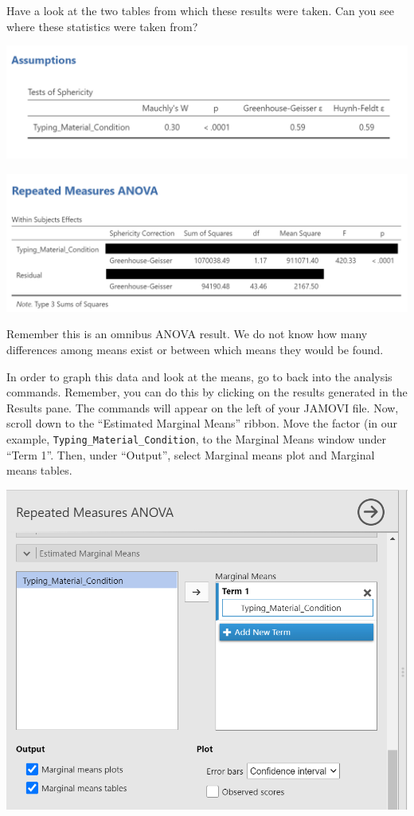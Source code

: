 \documentclass[
]{book}
\begin{document}
Have a look at the two tables from which these results were taken. Can you see where these statistics were taken from?

\includegraphics{img/RM_ANOVA_MauchlysTestResults.png}

\includegraphics{img/RM_ANOVA_Results_Simplified.png}

Remember this is an omnibus ANOVA result. We do not know how many differences among means exist or between which means they would be found.

In order to graph this data and look at the means, go to back into the analysis commands. Remember, you can do this by clicking on the results generated in the Results pane. The commands will appear on the left of your JAMOVI file. Now, scroll down to the ``Estimated Marginal Means'' ribbon. Move the factor (in our example, \texttt{Typing\_Material\_Condition}, to the Marginal Means window under ``Term 1''. Then, under ``Output'', select {Marginal means plot} and {Marginal means tables}.

\includegraphics{img/RM_ANOVA_Graph.png}
\end{document}
